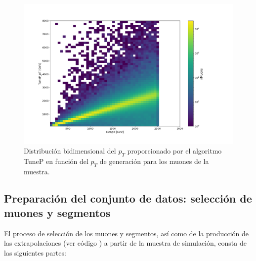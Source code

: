 \begin{figure}[h!]
\centering
\includegraphics[width=1.0\textwidth]{figures/data_tunePpt_genpt.png}
\caption{Distribuci\'on bidimensional del $p_{T}$ proporcionado por el algoritmo TuneP en funci\'on del $p_{T}$ de generaci\'on para los muones de la muestra.}
\label{fig:data_recopt_genpt}  
\end{figure}



\subsection{Preparaci\'on del conjunto de datos: selecci\'on de muones y segmentos}\label{sec:selection}

El proceso de selecci\'on de los muones y segmentos, as\'i como de la producci\'on de las extrapolaciones (ver c\'odigo \cite{analyzer}) a partir de la muestra de simulaci\'on, consta de las siguientes partes: 

